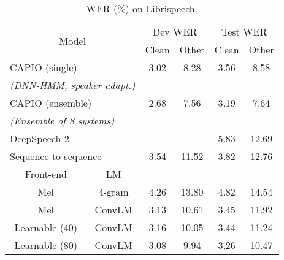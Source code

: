 \documentclass[a4paper]{article}
\begin{document}
\begin{table}[]
    \centering
    \hspace*{-0.5cm}
\begin{tabular}{lcccccc}
\toprule
\multicolumn{3}{c}{\multirow{2}{*}{Model}}                                      & \multicolumn{2}{c}{Dev WER} & \multicolumn{2}{c}{Test WER} \\ \cmidrule{4-7} 
\multicolumn{3}{c}{}                                                            & Clean        & Other        & Clean         & Other        \\ \midrule
\multicolumn{3}{l}{CAPIO (single) \cite{capio}}   &  3.02 & 8.28 & 3.56 & 8.58              \\
\multicolumn{3}{l}{\small \emph{(DNN-HMM, speaker adapt.)}}                            &              &              &               &         \\
\multicolumn{3}{l}{CAPIO (ensemble) \cite{capio}} &  2.68 & 7.56 & 3.19 & 7.64             \\
\multicolumn{3}{l}{\small \emph{(Ensemble of 8 systems)}}                            &              &              &               &         \\
\multicolumn{3}{l}{DeepSpeech 2 \cite{deepspeech2}}     & - & - & 5.83 & 12.69              \\
\multicolumn{3}{l}{Sequence-to-sequence \cite{improvedzeyer}}  &3.54 & 11.52 & 3.82 & 12.76            \\ \midrule
\multicolumn{2}{c}{Front-end}                     & LM                          &              &              &               &              \\ \cmidrule{1-3} 
\multicolumn{2}{c}{Mel}                           & 4-gram  & 4.26 & 13.80 & 4.82 & 14.54\\
\multicolumn{2}{c}{Mel}                           & ConvLM & 3.13 & 10.61 & 3.45 & 11.92           \\
\multicolumn{2}{c}{Learnable (40)}                     & ConvLM & 3.16 &10.05 &3.44 &11.24            \\
\multicolumn{2}{c}{Learnable (80)}                     & ConvLM & 3.08 &9.94 &3.26 &10.47  \\     \bottomrule
\end{tabular}
\caption{WER (\%) on Librispeech.}
\label{tab:libri}
\vspace{-4mm}
\end{table}
\end{document}
